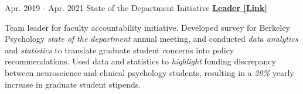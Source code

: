 \begin{cventries}
  \cventry 
    {Apr. 2019 - Apr. 2021} %
    {State of the Department Initiative}
    {\href{https://drive.google.com/file/d/1wD7y5gW39EU4vQUyhcrO7Fra1Ttc_HyG/view?usp=sharing}{\textbf{Leader [Link]}}} %
    {} %
    {
      \begin{cvitems} %
      	\item {Team leader for faculty accountability initiative. Developed survey for Berkeley Psychology \textit{state of the department} annual meeting, and conducted \textit{data analytics} and \textit{statistics} to translate graduate student concerns into policy recommendations. Used data and statistics to \textit{highlight} funding discrepancy between neuroscience and clinical psychology students, resulting in a \textit{20\%} yearly increase in graduate student stipends.}
      \end{cvitems}
    }

\end{cventries}


